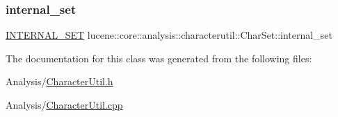 \subsubsection{\texorpdfstring{internal\+\_\+set}{internal\_set}}
{\footnotesize\ttfamily \mbox{\hyperlink{namespacelucene_1_1core_1_1analysis_1_1characterutil_a2b64bd3cca4a8e9112fcbfaebc68aeee}{I\+N\+T\+E\+R\+N\+A\+L\+\_\+\+S\+ET}} lucene\+::core\+::analysis\+::characterutil\+::\+Char\+Set\+::internal\+\_\+set\hspace{0.3cm}{\ttfamily [private]}}



The documentation for this class was generated from the following files\+:\begin{DoxyCompactItemize}
\item 
Analysis/\mbox{\hyperlink{CharacterUtil_8h}{Character\+Util.\+h}}\item 
Analysis/\mbox{\hyperlink{CharacterUtil_8cpp}{Character\+Util.\+cpp}}\end{DoxyCompactItemize}
